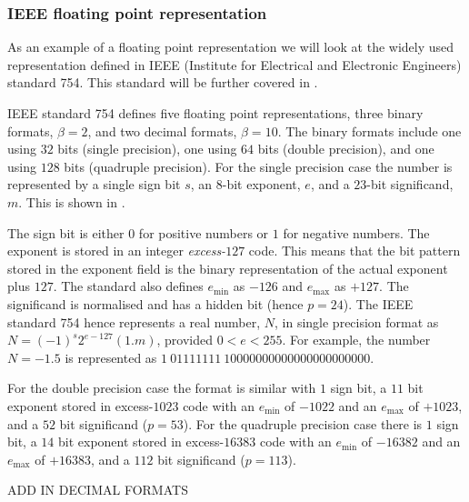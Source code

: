 \subsubsection{IEEE floating point representation}

As an example of a floating point representation we will look at the widely
used representation defined in IEEE (Institute for Electrical and Electronic
Engineers) standard 754. This standard will be further covered in
. 

IEEE standard 754 \citep{ieee754:2019} defines five floating point
representations, three binary formats, $\beta=2$, and two decimal
formats, $\beta=10$. The binary formats include one using $32$ bits
(single precision), one using $64$ bits (double precision), and one
using $128$ bits (quadruple precision). For the single precision case
the number is represented by a single sign bit $s$, an $8$-bit
exponent, $e$, and a $23$-bit significand, $m$.  This is shown in
.


The sign bit is either $0$ for positive numbers or $1$ for negative numbers.
The exponent is stored in an integer \emph{excess-$127$} code. This means that
the bit pattern stored in the exponent field is the binary representation of
the actual exponent plus $127$. The standard also defines $e_{\text{min}}$ as
$-126$ and $e_{\text{max}}$ as $+127$. The significand is normalised and has a
hidden bit (hence $p=24$).  The IEEE standard 754 hence represents a real
number, $N$, in single precision format as $N=(-1)^{s}2^{e-127}(1.m)$,
provided $0 < e < 255$.  For example, the number $N=-1.5$ is represented as
$1~01111111~10000000000000000000000$.

For the double precision case the format is similar with $1$ sign bit,
a $11$ bit exponent stored in excess-$1023$ code with an
$e_{\text{min}}$ of $-1022$ and an $e_{\text{max}}$ of $+1023$, and a
$52$ bit significand ($p=53$). For the quadruple precision case there
is $1$ sign bit, a $14$ bit exponent stored in excess-$16383$ code
with an $e_{\text{min}}$ of $-16382$ and an $e_{\text{max}}$ of
$+16383$, and a $112$ bit significand ($p=113$).

ADD IN DECIMAL FORMATS

